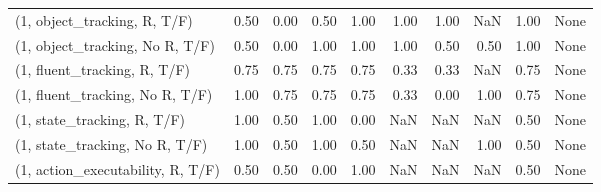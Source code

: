 \begin{table*}[h!]
\begin{adjustbox}{width=2\columnwidth,center}
\begin{tabular}{lrrr|rrr|rrr}
\midrule
(1, object\_tracking, R, T/F)         &                      0.50 &                  0.00 &                      0.50 &                          1.00 &                      1.00 &                          1.00 &                                    NaN &                               1.00 &                                  None \\
(1, object\_tracking, No R, T/F)      &                      0.50 &                  0.00 &                      1.00 &                          1.00 &                      1.00 &                          0.50 &                                   0.50 &                               1.00 &                                  None \\
(1, fluent\_tracking, R, T/F)         &                      0.75 &                  0.75 &                      0.75 &                          0.75 &                      0.33 &                          0.33 &                                    NaN &                               0.75 &                                  None \\
(1, fluent\_tracking, No R, T/F)      &                      1.00 &                  0.75 &                      0.75 &                          0.75 &                      0.33 &                          0.00 &                                   1.00 &                               0.75 &                                  None \\
(1, state\_tracking, R, T/F)          &                      1.00 &                  0.50 &                      1.00 &                          0.00 &                       NaN &                           NaN &                                    NaN &                               0.50 &                                  None \\
(1, state\_tracking, No R, T/F)       &                      1.00 &                  0.50 &                      1.00 &                          0.50 &                       NaN &                           NaN &                                   1.00 &                               0.50 &                                  None \\
(1, action\_executability, R, T/F)    &                      0.50 &                  0.50 &                      0.00 &                          1.00 &                       NaN &                           NaN &                                    NaN &                               0.50 &                                  None \\

\end{tabular}
\end{adjustbox}
\end{table*}
